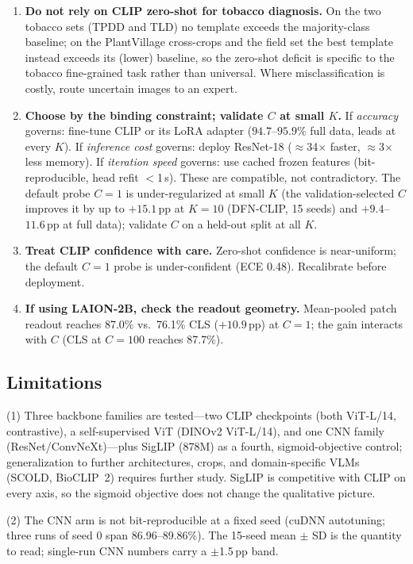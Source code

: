\documentclass[10pt,a4paper]{article}
\begin{document}
\begin{enumerate}
    \item \textbf{Do not rely on CLIP zero-shot for tobacco diagnosis.} On the two tobacco sets (TPDD and TLD) no template exceeds the majority-class baseline; on the PlantVillage cross-crops and the field set the best template instead exceeds its (lower) baseline, so the zero-shot deficit is specific to the tobacco fine-grained task rather than universal. Where misclassification is costly, route uncertain images to an expert.
    \item \textbf{Choose by the binding constraint; validate $C$ at small $K$.} If \emph{accuracy} governs: fine-tune CLIP or its LoRA adapter ($94.7$--$95.9\%$ full data, leads at every $K$). If \emph{inference cost} governs: deploy ResNet-18 ($\approx$34$\times$ faster, $\approx$3$\times$ less memory). If \emph{iteration speed} governs: use cached frozen features (bit-reproducible, head refit $<$1\,s). These are compatible, not contradictory. The default probe $C{=}1$ is under-regularized at small $K$ (the validation-selected $C$ improves it by up to $+15.1$\,pp at $K{=}10$ (DFN-CLIP, 15 seeds) and $+9.4$--$11.6$\,pp at full data); validate $C$ on a held-out split at all $K$.
    \item \textbf{Treat CLIP confidence with care.} Zero-shot confidence is near-uniform; the default $C{=}1$ probe is under-confident (ECE 0.48). Recalibrate before deployment.
    \item \textbf{If using LAION-2B, check the readout geometry.} Mean-pooled patch readout reaches 87.0\% vs.\ 76.1\% CLS ($+10.9$\,pp) at $C{=}1$; the gain interacts with $C$ (CLS at $C{=}100$ reaches 87.7\%).
\end{enumerate}

\subsection{Limitations}

(1) Three backbone families are tested---two CLIP checkpoints (both ViT-L/14, contrastive), a self-supervised ViT (DINOv2 ViT-L/14), and one CNN family (ResNet/ConvNeXt)---plus SigLIP (878M) as a fourth, sigmoid-objective control; generalization to further architectures, crops, and domain-specific VLMs (SCOLD, BioCLIP~2) requires further study. SigLIP is competitive with CLIP on every axis, so the sigmoid objective does not change the qualitative picture.

(2) The CNN arm is not bit-reproducible at a fixed seed (cuDNN autotuning; three runs of seed 0 span 86.96--89.86\%). The 15-seed mean $\pm$ SD is the quantity to read; single-run CNN numbers carry a $\pm$1.5\,pp band.
\end{document}
